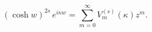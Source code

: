 \begin{equation}
(\cosh w)^{2s}\,e^{i\kappa w}
=\sum_{m=0}^{\infty} V_m^{(s)}(\kappa)z^m.
\label{223}
\end{equation}

